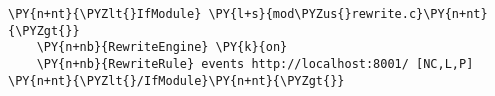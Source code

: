 \begin{Verbatim}[commandchars=\\\{\}]
\PY{n+nt}{\PYZlt{}IfModule} \PY{l+s}{mod\PYZus{}rewrite.c}\PY{n+nt}{\PYZgt{}}
	\PY{n+nb}{RewriteEngine} \PY{k}{on}
	\PY{n+nb}{RewriteRule} events http://localhost:8001/ [NC,L,P]
\PY{n+nt}{\PYZlt{}/IfModule}\PY{n+nt}{\PYZgt{}}
\end{Verbatim}
